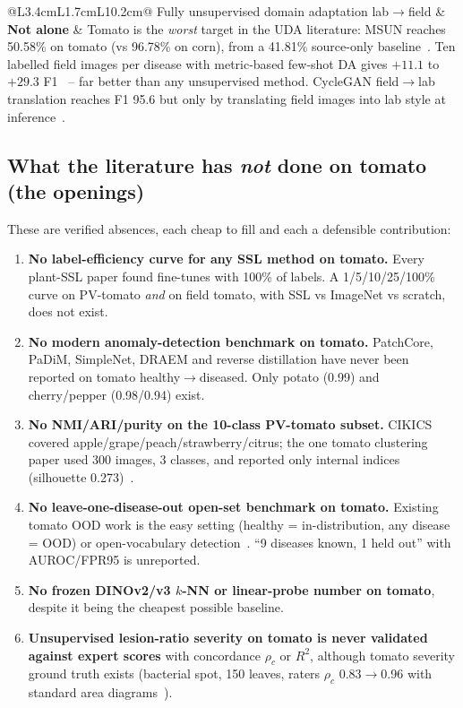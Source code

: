 \begin{center}
\begin{tabular}{@{}L{3.4cm}L{1.7cm}L{10.2cm}@{}}
Fully unsupervised domain adaptation lab$\to$field & \textbf{Not alone} & Tomato is the \emph{worst} target in the UDA literature: MSUN reaches 50.58\% on tomato (vs 96.78\% on corn), from a 41.81\% source-only baseline~\cite{msun2023}. Ten labelled field images per disease with metric-based few-shot DA gives $+11.1$ to $+29.3$ F1~\cite{fmda2024} -- far better than any unsupervised method. CycleGAN field$\to$lab translation reaches F1 95.6 but only by translating field images into lab style at inference~\cite{cho2023}. \\
\bottomrule
\end{tabular}
\end{center}

\subsection{What the literature has \emph{not} done on tomato (the openings)}
These are verified absences, each cheap to fill and each a defensible contribution:
\begin{enumerate}[label=U\arabic*]
  \item \label{u1} \textbf{No label-efficiency curve for any SSL method on tomato.} Every plant-SSL paper found fine-tunes with 100\% of labels. A 1/5/10/25/100\% curve on PV-tomato \emph{and} on field tomato, with SSL vs ImageNet vs scratch, does not exist.
  \item \label{u2} \textbf{No modern anomaly-detection benchmark on tomato.} PatchCore, PaDiM, SimpleNet, DRAEM and reverse distillation have never been reported on tomato healthy$\to$diseased. Only potato (0.99) and cherry/pepper (0.98/0.94) exist.
  \item \label{u3} \textbf{No NMI/ARI/purity on the 10-class PV-tomato subset.} CIKICS covered apple/grape/peach/strawberry/citrus; the one tomato clustering paper used 300 images, 3 classes, and reported only internal indices (silhouette 0.273)~\cite{wdmtsne}.
  \item \label{u4} \textbf{No leave-one-disease-out open-set benchmark on tomato.} Existing tomato OOD work is the easy setting (healthy = in-distribution, any disease = OOD) or open-vocabulary detection~\cite{pdcvld}. ``9 diseases known, 1 held out'' with AUROC/FPR95 is unreported.
  \item \label{u5} \textbf{No frozen DINOv2/v3 $k$-NN or linear-probe number on tomato}, despite it being the cheapest possible baseline.
  \item \label{u6} \textbf{Unsupervised lesion-ratio severity on tomato is never validated against expert scores} with concordance $\rho_c$ or $R^2$, although tomato severity ground truth exists (bacterial spot, 150 leaves, raters $\rho_c$ 0.83$\to$0.96 with standard area diagrams~\cite{sad2015}).
\end{enumerate}

